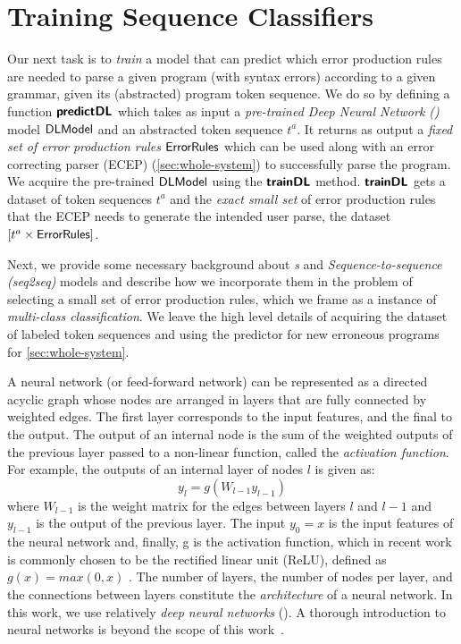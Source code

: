 \section{Training Sequence Classifiers}
\label{sec:seq-classifiers}

Our next task is to \emph{train} a model that can predict which error production
rules are needed to parse a given program (with syntax errors) according to a
given grammar, given its (abstracted) program token sequence.
%
We do so by defining a function $\bm{\mathsf{predictDL}}$ which takes as input a
\emph{pre-trained Deep Neural Network (\dnn)} model $\mathsf{DLModel}$ and an abstracted
token sequence $t^a$.
%
It returns as output a \emph{fixed set of error production rules}
$\mathsf{ErrorRules}$ which can be used along with an error correcting parser (ECEP)
(\autoref{sec:whole-system}) to successfully parse the program.
%
We acquire the pre-trained $\mathsf{DLModel}$ using the $\bm{\mathsf{trainDL}}$ method.
$\bm{\mathsf{trainDL}}$ gets a dataset of token sequences $t^a$ and the \emph{exact small
set} of error production rules that the ECEP needs to generate the intended user
parse, \ie the dataset $[t^a \times \mathsf{ErrorRules}]$.

Next, we provide some necessary background about \emph{\dnn{}s} and
\emph{Sequence-to-sequence (seq2seq)} models and describe how we incorporate
them in the problem of selecting a small set of error production rules, which we
frame as a instance of \emph{multi-class classification}. We leave the high
level details of acquiring the dataset of labeled token sequences and using the
predictor for new erroneous programs for \autoref{sec:whole-system}.

A neural network (or feed-forward network) can be represented as a directed
acyclic graph whose nodes are arranged in layers that are fully connected by
weighted edges. The first layer corresponds to the input features, and the final
to the output. The output of an internal node is the sum of the weighted outputs
of the previous layer passed to a non-linear function, called the
\emph{activation function}. For example, the outputs of an internal layer of
nodes $l$ is given as:
\begin{equation*}
    y_l = g(W_{l-1} y_{l-1})
\end{equation*}
where $W_{l-1}$ is the weight matrix for the edges between layers $l$ and $l-1$
and $y_{l-1}$ is the output of the previous layer. The input $y_0 = x$ is the
input features of the neural network and, finally, g is the activation function,
which in recent work is commonly chosen to be the rectified linear unit (ReLU),
defined as $g(x) = max(0, x)$ \citep{Nair2010-xg}.  The number of layers, the
number of nodes per layer, and the connections between layers constitute the
\emph{architecture} of a neural network. In this work, we use relatively
\emph{deep neural networks} (\dnn). A thorough introduction to neural networks
is beyond the scope of this work~\citep{Hastie2009-bn, Nielsen2015-pu}.


